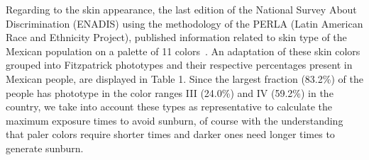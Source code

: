 \documentclass{article}
\begin{document}
Regarding to the skin appearance, the last edition of the National
Survey About Discrimination (ENADIS) using the methodology of the PERLA
(Latin American Race and Ethnicity Project), published information
related to skin type of the Mexican population on a palette of 11
colors~\cite{conacyt2010}. An adaptation of these skin colors grouped
into Fitzpatrick phototypes and their respective percentages present in
Mexican people, are displayed in Table 1. Since the largest fraction
(83.2\%) of the people has phototype in the color ranges III (24.0\%)
and IV (59.2\%) in the country, we take into account these types as
representative to calculate the maximum exposure times to avoid sunburn,
of course with the understanding that paler colors require shorter times
and darker ones need longer times to generate sunburn.
\end{document}
